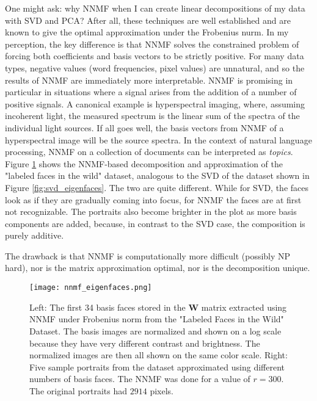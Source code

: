 One might ask: why NNMF when I can create linear decompositions of my data with SVD and PCA? After all, these techniques are well established and are known to give the optimal approximation under the Frobenius nurm. In my perception, the key difference is that NNMF solves the constrained problem of forcing both coefficients and basis vectors to be strictly positive. For many data types, negative values (word frequencies, pixel values) are unnatural, and so the results of NNMF are immediately more interpretable. NNMF is promising in particular in situations where a signal arises from the addition of a number of positive signals. A canonical example is hyperspectral imaging, where, assuming incoherent light, the measured spectrum is the linear sum of the spectra of the individual light sources. If all goes well, the basis vectors from NNMF of a hyperspectral image will be the source spectra. In the context of natural language processing, NNMF on a collection of documents can be interpreted as \textit{topics}. Figure \ref{fig:nnmf_eigenfaces} shows the NNMF-based decomposition and approximation of the "labeled faces in the wild" dataset, analogous to the SVD of the dataset shown in Figure \ref{fig:svd_eigenfaces}. The two are quite different. While for SVD, the faces look as if they are gradually coming into focus, for NNMF the faces are at first not recognizable. The portraits also become brighter in the plot as more basis components are added, because, in contrast to the SVD case, the composition is purely additive.  

The drawback is that NNMF is computationally more difficult (possibly NP hard), nor is the matrix approximation optimal, nor is the decomposition unique. 


\begin{figure}
\centering
    \texttt{[image: nnmf\_eigenfaces.png]}
    \caption{Left: The first 34 basis faces stored in the $\mathbf{W}$ matrix extracted using NNMF under Frobenius norm from the "Labeled Faces in the Wild" Dataset. The basis images are normalized and shown on a log scale because they have very different contrast and brightness. The normalized images are then all shown on the same color scale. Right: Five sample portraits from the dataset approximated using different numbers of basis faces. The NNMF was done for a value of $r=300$. The original portraits had $2914$ pixels.}
    \label{fig:nnmf_eigenfaces}
\end{figure}